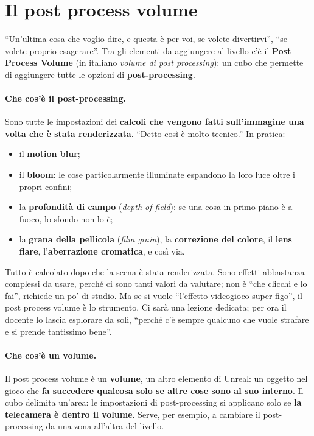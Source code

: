 \section{Il post process volume}
\label{gd11:sec:postprocess}

``Un'ultima cosa che voglio dire, e questa è per voi, se volete divertirvi'',
``se volete proprio esagerare''. Tra gli elementi da aggiungere al livello c'è il
\textbf{Post Process Volume} (in italiano \emph{volume di post processing}): un
cubo che permette di aggiungere tutte le opzioni di \textbf{post-processing}.

\paragraph{Che cos'è il post-processing.} Sono tutte le impostazioni dei
\textbf{calcoli che vengono fatti sull'immagine una volta che è stata
renderizzata}. ``Detto così è molto tecnico.'' In pratica:
\begin{itemize}
  \item il \textbf{motion blur};
  \item il \textbf{bloom}: le cose particolarmente illuminate espandono la
        loro luce oltre i propri confini;
  \item la \textbf{profondità di campo} (\emph{depth of field}): se una cosa in
        primo piano è a fuoco, lo sfondo non lo è;
  \item la \textbf{grana della pellicola} (\emph{film grain}), la
        \textbf{correzione del colore}, il \textbf{lens flare},
        l'\textbf{aberrazione cromatica}, e così via.
\end{itemize}
Tutto è calcolato dopo che la scena è stata renderizzata. Sono effetti
abbastanza complessi da usare, perché ci sono tanti valori da valutare; non è
``che clicchi e lo fai'', richiede un po' di studio. Ma se si vuole ``l'effetto
videogioco super figo'', il post process volume è lo strumento. Ci sarà una
lezione dedicata; per ora il docente lo lascia esplorare da soli, ``perché c'è
sempre qualcuno che vuole strafare e si prende tantissimo bene''.

\paragraph{Che cos'è un volume.} Il post process volume è un
\textbf{volume}, un altro elemento di Unreal: un oggetto nel gioco che
\textbf{fa succedere qualcosa solo se altre cose sono al suo interno}. Il cubo
delimita un'area: le impostazioni di post-processing si applicano solo se
\textbf{la telecamera è dentro il volume}. Serve, per esempio, a cambiare il
post-processing da una zona all'altra del livello.

